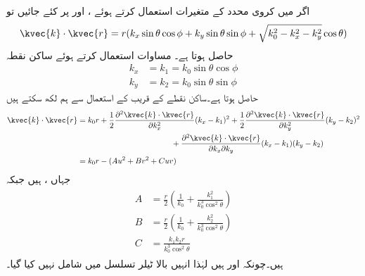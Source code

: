 اگر  میں کروی محدد کے متغیرات استعمال کرتے ہوئے ،  اور  پر کئے جائیں تو
\begin{align}
\kvec{k}\cdot\kvec{r}=r(k_x \sin\theta\cos\phi+k_y\sin\theta\sin\phi+\sqrt{k_0^2-k_x^2-k_y^2}\cos \theta)
\end{align}
حاصل ہوتا ہے۔ مساوات  استعمال کرتے ہوئے ساکن نقطہ
\begin{align}
k_x&=k_1=k_0 \sin\theta\cos\phi\\
k_y&=k_2=k_0\sin\theta\sin\phi
\end{align}
حاصل ہوتا ہے۔ساکن نقطے کے قریب  کے استعمال سے ہم لکھ سکتے ہیں
\begin{align*}
\kvec{k}\cdot\kvec{r}&=k_0 r +\frac{1}{2}\frac{\partial^2 \kvec{k}\cdot\kvec{r}  }{\partial k_x^2} (k_x-k_1)^2+\frac{1}{2}\frac{\partial^2 \kvec{k}\cdot\kvec{r}  }{\partial k_y^2} (k_y-k_2)^2 \\
& \quad \quad\quad \quad\quad \quad\quad \quad\quad \quad\quad \quad +\frac{\partial^2 \kvec{k}\cdot\kvec{r}  }{\partial k_x \partial k_y} (k_x-k_1)(k_y-k_2)\\
&=k_0 r-(A u^2+B v^2+C u v)
\end{align*}
جہاں ،  ہیں جبکہ
\begin{gather}
\begin{aligned}\label{مساوات_اینٹینا_ساکن_نقطہ_مستقل}
A&=\frac{r}{2}\left(\frac{1}{k_0}+\frac{k_1^2}{k_0^3 \cos^2 \theta}\right)\\
B&=\frac{r}{2}\left(\frac{1}{k_0}+\frac{k_2^2}{k_0^3 \cos^2 \theta}\right)\\
C&=\frac{k_1 k_2 r}{k_0^3 \cos^2 \theta}
\end{aligned}
\end{gather}
ہیں۔چونکہ  اور  ہیں لہٰذا  انہیں بالا ٹیلر تسلسل میں شامل نہیں کیا گیا۔

